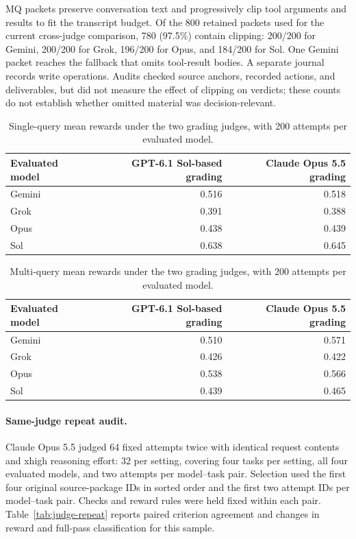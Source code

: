 \documentclass[11pt,letterpaper]{article}
\begin{document}
MQ packets preserve conversation text and progressively clip tool arguments and results to fit the transcript budget. Of the 800 retained packets used for the current cross-judge comparison, 780 (97.5\%) contain clipping: 200/200 for Gemini, 200/200 for Grok, 196/200 for Opus, and 184/200 for Sol. One Gemini packet reaches the fallback that omits tool-result bodies. A separate journal records write operations. Audits checked source anchors, recorded actions, and deliverables, but did not measure the effect of clipping on verdicts; these counts do not establish whether omitted material was decision-relevant.

\begin{table}[H]\centering\small
\caption{Single-query mean rewards under the two grading judges, with 200 attempts per evaluated model.}\label{tab:judge-sq-reward}
\begin{tabular}{@{}lrr@{}}\toprule
Evaluated model & GPT-6.1 Sol-based grading & Claude Opus 5.5 grading\\\midrule
Gemini & 0.516 & 0.518\\
Grok & 0.391 & 0.388\\
Opus & 0.438 & 0.439\\
Sol & 0.638 & 0.645\\
\bottomrule\end{tabular}
\end{table}

\begin{table}[H]\centering\small
\caption{Multi-query mean rewards under the two grading judges, with 200 attempts per evaluated model.}\label{tab:judge-mq-reward}
\begin{tabular}{@{}lrr@{}}\toprule
Evaluated model & GPT-6.1 Sol-based grading & Claude Opus 5.5 grading\\\midrule
Gemini & 0.510 & 0.571\\
Grok & 0.426 & 0.422\\
Opus & 0.538 & 0.566\\
Sol & 0.439 & 0.465\\
\bottomrule\end{tabular}
\end{table}


\paragraph{Same-judge repeat audit.}
Claude Opus 5.5 judged 64 fixed attempts twice with identical request contents and xhigh reasoning effort: 32 per setting, covering four tasks per setting, all four evaluated models, and two attempts per model--task pair. Selection used the first four original source-package IDs in sorted order and the first two attempt IDs per model--task pair. Checks and reward rules were held fixed within each pair. Table~\ref{tab:judge-repeat} reports paired criterion agreement and changes in reward and full-pass classification for this sample.
\end{document}
